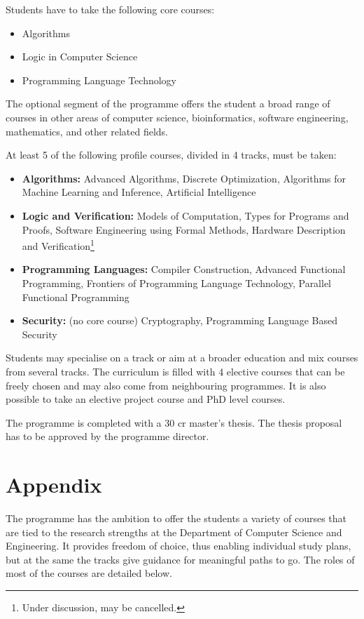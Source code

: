 \documentclass[twocolumn]{article}
\begin{document}
Students have to take the following core courses:
\begin{itemize}
\item Algorithms
\item Logic in Computer Science
\item Programming Language Technology
\end{itemize}

The optional segment of the programme offers the student a broad range
of courses in other areas of computer science, bioinformatics,
software engineering, mathematics, and other related fields.
 
At least 5 of the following profile courses, divided in 4 tracks, must
be taken:

\begin{itemize}
\item {\bf Algorithms:} Advanced Algorithms, Discrete Optimization,
  Algorithms for Machine Learning and Inference, Artificial
  Intelligence
\item {\bf Logic and Verification:} Models of Computation, Types for
  Programs and Proofs, Software Engineering using Formal Methods,
  Hardware Description and Verification\footnote{Under discussion, may
    be cancelled.}
\item {\bf Programming Languages:} Compiler Construction, Advanced
  Functional Programming, Frontiers of Programming Language
  Technology, Parallel Functional Programming
\item {\bf Security:} (no core course) Cryptography, Programming
  Language Based Security
\end{itemize}

Students may specialise on a track or aim at a broader education and
mix courses from several tracks. The curriculum is filled with 4
elective courses that can be freely chosen and may also come from
neighbouring programmes. It is also possible to take an elective project
course and PhD level courses.

The programme is completed with a 30 cr master's thesis. The
thesis proposal has to be approved by the programme director.

\section*{Appendix}

The programme has the ambition to offer the students a variety of
courses that are tied to the research strengths at the Department of
Computer Science and Engineering. It provides freedom of choice, thus
enabling individual study plans, but at the same the tracks give
guidance for meaningful paths to go.  The roles of most of the courses
are detailed below.
\end{document}
